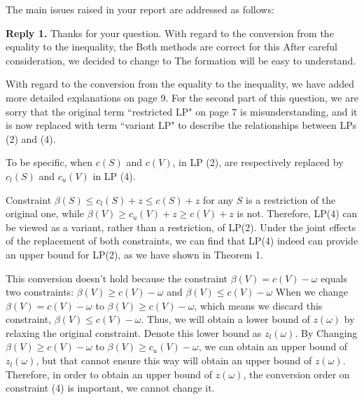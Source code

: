 \documentclass[11pt]{article}
\begin{document}
The main issues raised in your report are addressed as follows:
\\[4mm]
%
%

\noindent \textbf{Reply 1.}
Thanks for your question. With regard to the conversion from the equality to the inequality, the
Both methods are correct for this
After careful consideration, we decided to change to
The formation will be easy to understand.

With regard to the conversion from the equality to the inequality, we have added more detailed explanations on page 9. For the second part of this question, we are sorry that the original term ``restricted LP" on page 7 is misunderstanding, and it is now replaced with term ``variant LP" to describe the relationships between LPs (2) and (4).

To be specific, when $c(S)$ and $c(V)$, in LP (2), are respectively replaced by $c_l(S)$ and $c_u(V)$ in LP (4).

Constraint $\beta(S) \leq c_l(S) + z \leq c(S) + z$ for any $S$ is a restriction of the original one, while
$\beta(V) \geq c_u(V) + z \geq c(V) + z$ is not.
Therefore, LP(4) can be viewed as a variant, rather than a restriction, of LP(2).
Under the joint effects of the replacement of both constraints, we can find that LP(4) indeed can provide an upper bound for LP(2), as we have shown in Theorem 1.

This conversion doesn't hold because
the constraint $\beta(V) = c(V) - \omega$ equals two constraints: $\beta(V) \geq c(V) - \omega$ and $\beta(V) \leq c(V) - \omega$
When we change $\beta(V) = c(V) - \omega$ to $\beta(V) \geq c(V) - \omega$, which means we discard this constraint, $\beta(V) \leq c(V) - \omega$. Thus, we will obtain a lower bound of $z(\omega)$ by relaxing the original constraint. Denote this lower bound as $z_l(\omega)$. By Changing $\beta(V) \geq c(V) - \omega$ to $\beta(V) \geq c_u(V) - \omega$, we can obtain an upper bound of $z_l(\omega)$, but that cannot ensure this way will obtain an upper bound of $z(\omega)$.
Therefore, in order to obtain an upper bound of $z(\omega)$, the conversion order on constraint (4) is important, we cannot change it.
\end{document}
